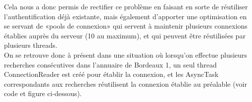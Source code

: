 \begin{figure}[h!]
  \label{fig:without_pool_code}
  \center
  \setlength\fboxsep{5pt}
  \setlength\fboxrule{0.5pt}
\end{figure}

\begin{figure}[h!]
  \label{fig:without_pool}
  \center
  \setlength\fboxsep{5pt}
  \setlength\fboxrule{0.5pt}
\end{figure}

Cela nous a donc permis de rectifier ce problème en faisant en sorte de réutiliser l’authentification déjà existante, mais également d’apporter une optimisation en se servant de «pools de connexion» qui servent à maintenir plusieurs connexions établies auprès du serveur (10 au maximum),  et qui peuvent être réutilisées par plusieurs threads.\\
On se retrouve donc à présent dans une situation où lorsqu’on effectue plusieurs recherches consécutives dans l’annuaire de Bordeaux 1, un seul thread ConnectionReader est créé pour établir la connexion, et les AsyncTask correspondants aux recherches réutilisent la connexion établie au préalable (voir code et figure ci-dessous).

\begin{figure}[h!]
  \label{fig:with_pool_code}
  \center
  \setlength\fboxsep{5pt}
  \setlength\fboxrule{0.5pt}
\end{figure}

